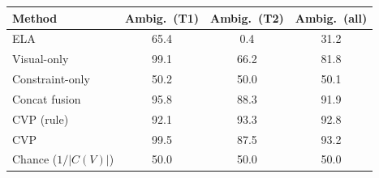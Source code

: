 \begin{tabular}{lccc}
\toprule
Method & Ambig.\ (T1) & Ambig.\ (T2) & Ambig.\ (all)\\
\midrule
ELA & 65.4 & 0.4 & 31.2\\
Visual-only & 99.1 & 66.2 & 81.8\\
Constraint-only & 50.2 & 50.0 & 50.1\\
Concat fusion & 95.8 & 88.3 & 91.9\\
CVP (rule) & 92.1 & 93.3 & 92.8\\
CVP & 99.5 & 87.5 & 93.2\\
\midrule
Chance ($1/|C(V)|$) & 50.0 & 50.0 & 50.0\\
\bottomrule
\end{tabular}

